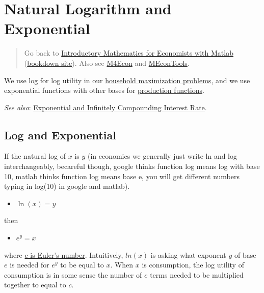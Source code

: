 \documentclass[
]{book}
\providecommand{\tightlist}{%
  \setlength{\itemsep}{0pt}\setlength{\parskip}{0pt}}
\begin{document}
\hypertarget{natural-logarithm-and-exponential}{%
\section{Natural Logarithm and Exponential}\label{natural-logarithm-and-exponential}}

\begin{quote}
Go back to \href{https://math4econ.github.io/}{Introductory Mathematics for Economists with Matlab} (\href{https://math4econ.github.io/bookdown}{bookdown site}). Also see \href{http://fanwangecon.github.io/M4Econ}{M4Econ} and \href{https://fanwangecon.github.io/MEconTools/}{MEconTools}.
\end{quote}

We use log for log utility in our \href{https://math4econ.github.io/derivative_application/K_save_households.html}{household maximization
problems},
and we use exponential functions with other bases for \href{https://math4econ.github.io/derivative_application/K_borrow_firm.html}{production
functions}.

\emph{See also}: \href{https://math4econ.github.io/explog/exponential.html}{Exponential and Infinitely Compounding Interest
Rate}.

\hypertarget{log-and-exponential}{%
\subsection{Log and Exponential}\label{log-and-exponential}}

If the natural log of \(x\) is \(y\) (in economics we generally just write
ln and log interchangeably, becareful though, google thinks function log
means log with base 10, matlab thinks function log means base e, you
will get different numbers typing in log(10) in google and matlab).

\begin{itemize}
\tightlist
\item
  \(\displaystyle \ln (x)=y\)
\end{itemize}

then

\begin{itemize}
\tightlist
\item
  \(\displaystyle e^y =x\)
\end{itemize}

where \href{https://en.wikipedia.org/wiki/E_(mathematical_constant)}{e is Euler's
number}.
Intuitively, \(ln(x)\) is asking what exponent \(y\) of base \(e\) is needed
for \(e^y\) to be equal to \(x\). When \(x\) is consumption, the log utility
of consumption is in some sense the number of \(e\) terms needed to be
multiplied together to equal to \(c\).
\end{document}
